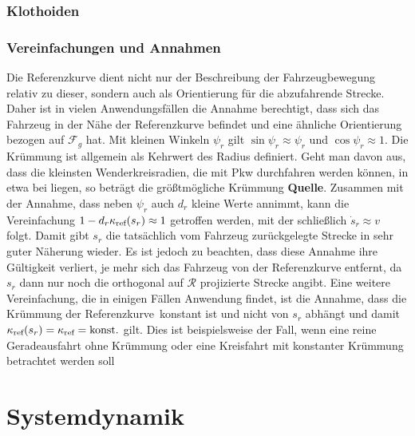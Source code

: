 \subsubsection{Klothoiden}\label{subsubsec:Klothoiden}
 
\subsubsection{Vereinfachungen und Annahmen}\label{subsubsec:Vereinfachungen}
Die Referenzkurve dient nicht nur der Beschreibung der Fahrzeugbewegung relativ zu dieser, sondern auch als Orientierung für die abzufahrende Strecke. Daher ist in vielen Anwendungsfällen die Annahme berechtigt, dass sich das Fahrzeug in der Nähe der Referenzkurve befindet und eine ähnliche Orientierung bezogen auf $\mathcal{F}_g$ hat. Mit kleinen Winkeln $\psi_r$ gilt $\sin{\psi_r}\approx\psi_r$ und $\cos{\psi_r}\approx 1$. Die Krümmung ist allgemein als Kehrwert des Radius definiert. Geht man davon aus, dass die kleinsten Wenderkreisradien, die mit Pkw durchfahren werden können, in etwa bei  liegen, so beträgt die größtmögliche Krümmung  \textbf{Quelle}. Zusammen mit der Annahme, dass neben $\psi_r$ auch $d_r$ kleine Werte annimmt, kann die Vereinfachung $1-d_r\kappa_{\textrm{ref}}(s_r)\approx 1$ getroffen werden, mit der schließlich $\dot{s}_r\approx v$ folgt. Damit gibt $s_r$ die tatsächlich vom Fahrzeug zurückgelegte Strecke in sehr guter Näherung wieder. Es ist jedoch zu beachten, dass diese Annahme ihre Gültigkeit verliert, je mehr sich das Fahrzeug von der Referenzkurve entfernt, da $s_r$ dann nur noch die orthogonal auf $\mathcal{R}$ projizierte Strecke angibt. Eine weitere Vereinfachung, die in einigen Fällen Anwendung findet, ist die Annahme, dass die Krümmung der Referenzkurve \kapparefofs\,konstant ist und nicht von $s_r$ abhängt und damit $\kappa_{\textrm{ref}}(s_r)=\kappa_{\textrm{ref}}=\textrm{konst.}$ gilt. Dies ist beispielsweise der Fall, wenn eine reine Geradeausfahrt ohne Krümmung oder eine Kreisfahrt mit konstanter Krümmung betrachtet werden soll

\section{Systemdynamik}\label{sec:Systemdynamik}